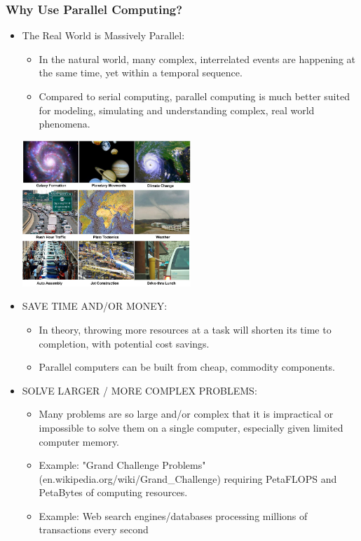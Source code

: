\documentclass[10pt,t]{beamer}
\begin{document}
\begin{frame}[allowframebreaks,c]
\frametitle{Why Use Parallel Computing?}
\begin{itemize}
\item The Real World is Massively Parallel:
\begin{itemize}
\item In the natural world, many complex, interrelated events are happening at the same time, yet within a temporal sequence.
\item Compared to serial computing, parallel computing is much better suited for modeling, simulating and understanding complex, real world phenomena.
\end{itemize}
\begin{center}
\includegraphics[width=0.5\textwidth]{./realworldcollage}
\end{center}
\framebreak
\item SAVE TIME AND/OR MONEY:
\begin{itemize}
\item In theory, throwing more resources at a task will shorten its time to completion, with potential cost savings.
\item Parallel computers can be built from cheap, commodity components.
\end{itemize}
\item SOLVE LARGER / MORE COMPLEX PROBLEMS:
\begin{itemize}
\item Many problems are so large and/or complex that it is impractical or impossible to solve them on a single computer, especially given limited computer memory.
\item Example: "Grand Challenge Problems" (en.wikipedia.org/wiki/Grand\_Challenge) requiring PetaFLOPS and PetaBytes of computing resources.
\item Example: Web search engines/databases processing millions of transactions every second
\end{itemize}

\end{itemize}
\end{frame}
\end{document}
